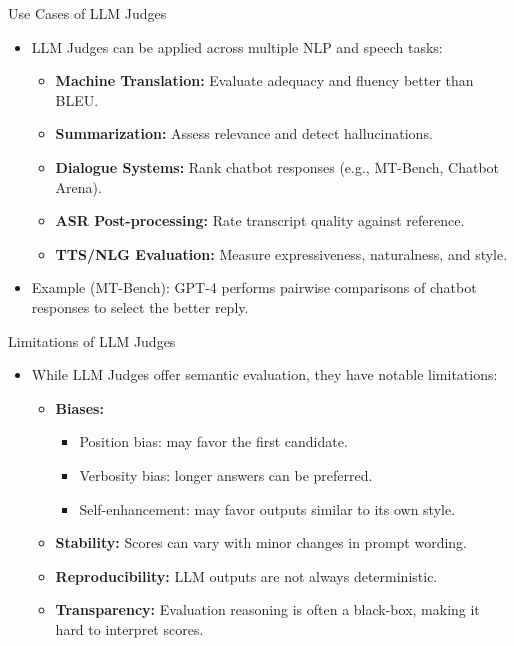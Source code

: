 \begin{frame}[allowframebreaks]{Use Cases of LLM Judges}

\begin{itemize}
    \item LLM Judges can be applied across multiple NLP and speech tasks:

    \begin{itemize}
        \item \textbf{Machine Translation:} Evaluate adequacy and fluency better than BLEU.  
        \item \textbf{Summarization:} Assess relevance and detect hallucinations.  
        \item \textbf{Dialogue Systems:} Rank chatbot responses (e.g., MT-Bench, Chatbot Arena).  
        \item \textbf{ASR Post-processing:} Rate transcript quality against reference.  
        \item \textbf{TTS/NLG Evaluation:} Measure expressiveness, naturalness, and style.
    \end{itemize}

    \item Example (MT-Bench): GPT-4 performs pairwise comparisons of chatbot responses to select the better reply.
\end{itemize}

\end{frame}


\begin{frame}[allowframebreaks]{Limitations of LLM Judges}

\begin{itemize}
    \item While LLM Judges offer semantic evaluation, they have notable limitations:

    \begin{itemize}
        \item \textbf{Biases:}  
        \begin{itemize}
            \item Position bias: may favor the first candidate.  
            \item Verbosity bias: longer answers can be preferred.  
            \item Self-enhancement: may favor outputs similar to its own style.
        \end{itemize}

        \item \textbf{Stability:} Scores can vary with minor changes in prompt wording.

        \item \textbf{Reproducibility:} LLM outputs are not always deterministic.

        \item \textbf{Transparency:} Evaluation reasoning is often a black-box, making it hard to interpret scores.
    \end{itemize}
\end{itemize}

\end{frame}


